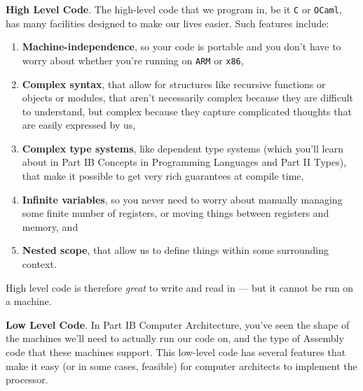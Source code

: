 \textbf{High Level Code}. The high-level code that we program in, be it \texttt{C} or \texttt{OCaml}, has many facilities designed to make our lives easier. Such features include:

\begin{enumerate}
    \item \textbf{Machine-independence}, so your code is portable and you don't have to worry about whether you're running on \texttt{ARM} or \texttt{x86},
    \item \textbf{Complex syntax}, that allow for structures like recursive functions or objects or modules, that aren't necessarily complex because they are difficult to understand, but complex because they capture complicated thoughts that are easily expressed by us,
    \item \textbf{Complex type systems}, like dependent type systems (which you'll learn about in {\sffamily Part IB Concepts in Programming Languages} and {\sffamily Part II Types}), that make it possible to get very rich guarantees at compile time,
    \item \textbf{Infinite variables}, so you never need to worry about manually managing some finite number of registers, or moving things between registers and memory, and
    \item \textbf{Nested scope}, that allow us to define things within some surrounding context.
\end{enumerate}

High level code is therefore \emph{great} to write and read in --- but it cannot be run on a machine. 

\textbf{Low Level Code}. In {\sffamily Part IB Computer Architecture}, you've seen the shape of the machines we'll need to actually run our code on, and the type of Assembly code that these machines support. This low-level code has several features that make it easy (or in some cases, feasible) for computer architects to implement the processor.

